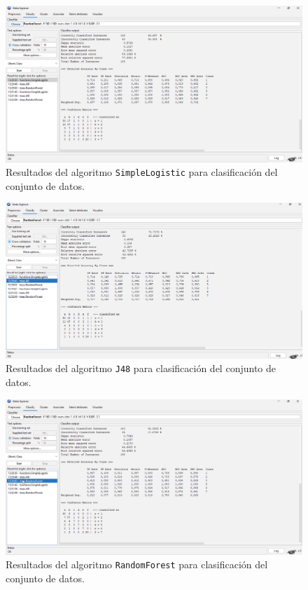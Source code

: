 \documentclass{article}
\begin{document}
\begin{figure}[!ht]
    \centering
    \includegraphics[width=1\linewidth]{Imágenes/SimpleLogistic.png}
    \caption{Resultados del algoritmo \texttt{SimpleLogistic} para clasificación del conjunto de datos.}
    \label{fig:simple-logistic}
\end{figure}

\begin{figure}[!ht]
    \centering
    \includegraphics[width=1\linewidth]{Imágenes/j48.png}
    \caption{Resultados del algoritmo \texttt{J48} para clasificación del conjunto de datos.}
    \label{fig:j48}
\end{figure}

\begin{figure}[!ht]
    \centering
    \includegraphics[width=1\linewidth]{Imágenes/RandomForest.png}
    \caption{Resultados del algoritmo \texttt{RandomForest} para clasificación del conjunto de datos.}
    \label{fig:random-forest}
\end{figure}
\end{document}
